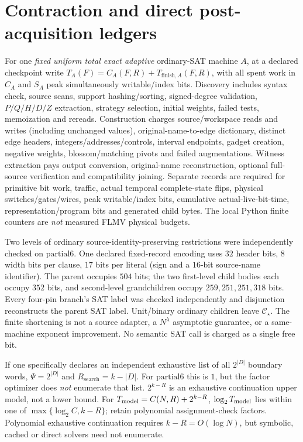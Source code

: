 \documentclass[11pt]{article}
\newcommand{\CS}{\mathcal C_\star}
\begin{document}
\section{Contraction and direct post-acquisition ledgers}
For one \emph{fixed uniform total exact adaptive} ordinary-SAT machine $A$, at a declared checkpoint write $T_A(F)=C_A(F,R)+T_{\mathrm{finish},A}(F,R)$, with all spent work in $C_A$ and $S_A$ peak simultaneously writable/index bits. Discovery includes syntax check, source scans, support hashing/sorting, signed-degree validation, $P/Q/H/D/Z$ extraction, strategy selection, initial weights, failed tests, memoization and rereads. Construction charges source/workspace reads and writes (including unchanged values), original-name-to-edge dictionary, distinct edge headers, integers/addresses/controls, interval endpoints, gadget creation, negative weights, blossom/matching pivots and failed augmentations. Witness extraction pays output conversion, original-name reconstruction, optional full-source verification and compatibility joining. Separate records are required for primitive bit work, traffic, actual temporal complete-state flips, physical switches/gates/wires, peak writable/index bits, cumulative actual-live-bit-time, representation/program bits and generated child bytes. The local Python finite counters are \emph{not} measured FLMV physical budgets.

Two levels of ordinary source-identity-preserving restrictions were independently checked on $\mathrm{partial6}$. One declared fixed-record encoding uses $32$ header bits, $8$ width bits per clause, $17$ bits per literal (sign and a $16$-bit source-name identifier). The parent occupies $504$ bits; the two first-level child bodies each occupy $352$ bits, and second-level grandchildren occupy $259,251,251,318$ bits. Every four-pin branch's SAT label was checked independently and disjunction reconstructs the parent SAT label. Unit/binary ordinary children leave $\CS$. The finite shortening is not a source adapter, a $N^\lambda$ asymptotic guarantee, or a same-machine exponent improvement. No semantic SAT call is charged as a single free bit.

If one specifically declares an independent exhaustive list of all $2^{|D|}$ boundary words, $\Psi=2^{|D|}$ and $R_{\mathrm{search}}=k-|D|$. For $\mathrm{partial6}$ this is $1$, but the factor optimizer does \emph{not} enumerate that list. $2^{k-R}$ is an exhaustive continuation upper model, not a lower bound. For $T_{\rm model}=C(N,R)+2^{k-R}$, $\log_2T_{\rm model}$ lies within one of $\max\{\log_2 C,k-R\}$; retain polynomial assignment-check factors. Polynomial exhaustive continuation requires $k-R=O(\log N)$, but symbolic, cached or direct solvers need not enumerate.
\end{document}
